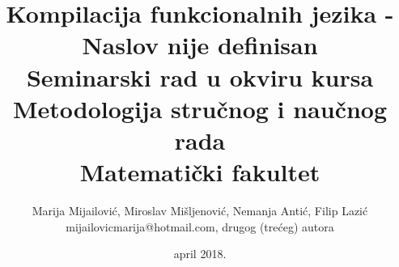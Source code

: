 \documentclass[a4paper]{article}
\begin{document}
\title{Kompilacija funkcionalnih jezika - Naslov nije definisan\\ \small{Seminarski rad u okviru kursa\\Metodologija stručnog i naučnog rada\\ Matematički fakultet}}

\author{Marija Mijailović, Miroslav Mišljenović, Nemanja Antić, Filip Lazić\\ mijailovicmarija@hotmail.com, drugog (trećeg) autora}
\date{april 2018.}
\maketitle



\tableofcontents

\newpage








\appendix
 


\appendix

\end{document}
